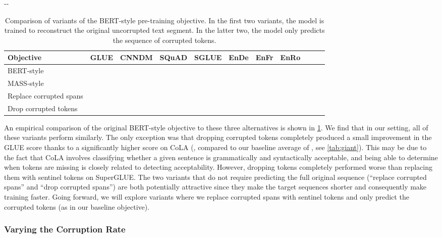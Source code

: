 \documentclass[twoside,11pt]{article}
\newlength{\offsetpage}
\newenvironment{widepage}{\begin{adjustwidth}{-\offsetpage}{-\offsetpage}\addtolength{\textwidth}{2\offsetpage}}{\end{adjustwidth}}
\newcommand{\bsl}{\makebox[0pt][r]{\raisebox{0.05em}{}}}
\begin{document}
\begin{table}
\footnotesize
\begin{widepage}
\centering
\begin{tabular}{l c c c c c c c c c c}
\toprule
    Objective                         & GLUE        & CNNDM       & SQuAD       & SGLUE       & EnDe        & EnFr        & EnRo    \\
\midrule
    BERT-style \citep{devlin2018bert} &      &      &  &      &      &  &  \\
    MASS-style \citep{song2019mass}   &      &      &      &      &      &  &  \\
    \bsl Replace corrupted spans      &      &  &  &  &  &      &  \\
    Drop corrupted tokens             &  &  &  &      &  &      &  \\
\bottomrule
\end{tabular}
\end{widepage}
\caption{
Comparison of variants of the BERT-style pre-training objective.
In the first two variants, the model is trained to reconstruct the original uncorrupted text segment.
In the latter two, the model only predicts the sequence of corrupted tokens.
}
\label{tab:objectives_bert}
\end{table}

An empirical comparison of the original BERT-style objective to these three alternatives is shown in \cref{tab:objectives_bert}.
We find that in our setting, all of these variants perform similarly.
The only exception was that dropping corrupted tokens completely produced a small improvement in the GLUE score thanks to a significantly higher score on CoLA (, compared to our baseline average of , see \cref{tab:giant}).
This may be due to the fact that CoLA involves classifying whether a given sentence is grammatically and syntactically acceptable, and being able to determine when tokens are missing is closely related to detecting acceptability.
However, dropping tokens completely performed worse than replacing them with sentinel tokens on SuperGLUE.
The two variants that do not require predicting the full original sequence (``replace corrupted spans'' and ``drop corrupted spans'') are both potentially attractive since they make the target sequences shorter and consequently make training faster.
Going forward, we will explore variants where we replace corrupted spans with sentinel tokens and only predict the corrupted tokens (as in our baseline objective).

\subsubsection{Varying the Corruption Rate}
\label{sec:corruption_rate}
\end{document}
